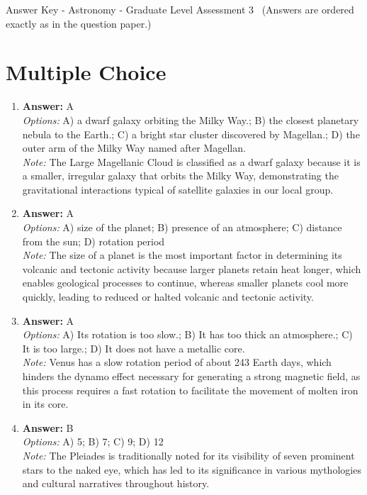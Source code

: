 \documentclass[12pt]{article}
\begin{document}
\begin{center}
Answer Key - Astronomy - Graduate Level Assessment 3 \
\small (Answers are ordered exactly as in the question paper.)
\end{center}

\section*{Multiple Choice}
\begin{enumerate}[label=\arabic*.]
\item \textbf{Answer:} A
\\ \textit{Options:} A) a dwarf galaxy orbiting the Milky Way.; B) the closest planetary nebula to the Earth.; C) a bright star cluster discovered by Magellan.; D) the outer arm of the Milky Way named after Magellan.
\\ \textit{Note:} The Large Magellanic Cloud is classified as a dwarf galaxy because it is a smaller, irregular galaxy that orbits the Milky Way, demonstrating the gravitational interactions typical of satellite galaxies in our local group.
\item \textbf{Answer:} A
\\ \textit{Options:} A) size of the planet; B) presence of an atmosphere; C) distance from the sun; D) rotation period
\\ \textit{Note:} The size of a planet is the most important factor in determining its volcanic and tectonic activity because larger planets retain heat longer, which enables geological processes to continue, whereas smaller planets cool more quickly, leading to reduced or halted volcanic and tectonic activity.
\item \textbf{Answer:} A
\\ \textit{Options:} A) Its rotation is too slow.; B) It has too thick an atmosphere.; C) It is too large.; D) It does not have a metallic core.
\\ \textit{Note:} Venus has a slow rotation period of about 243 Earth days, which hinders the dynamo effect necessary for generating a strong magnetic field, as this process requires a fast rotation to facilitate the movement of molten iron in its core.
\item \textbf{Answer:} B
\\ \textit{Options:} A) 5; B) 7; C) 9; D) 12
\\ \textit{Note:} The Pleiades is traditionally noted for its visibility of seven prominent stars to the naked eye, which has led to its significance in various mythologies and cultural narratives throughout history.

\end{enumerate}
\end{document}
